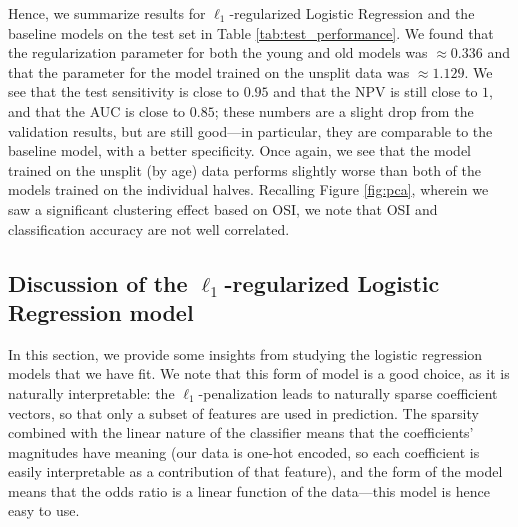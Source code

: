 \documentclass[11pt, letterpaper]{amsart}
\let\Oldsubsection\subsection
\renewcommand{\subsection}{\FloatBarrier\Oldsubsection}
\begin{document}
Hence, we summarize results for $\ell_1$-regularized Logistic Regression and the baseline models on the test set in Table \ref{tab:test_performance}. We found that the regularization parameter for both the young and old models was $\approx 0.336$ and that the parameter for the model trained on the unsplit data was $\approx 1.129$. We see that the test sensitivity is close to $0.95$ and that the NPV is still close to $1$, and that the AUC is close to $0.85$; these numbers are a slight drop from the validation results, but are still good---in particular, they are comparable to the baseline model, with a better specificity. Once again, we see that the model trained on the unsplit (by age) data performs slightly worse than both of the models trained on the individual halves. Recalling Figure \ref{fig:pca}, wherein we saw a significant clustering effect based on OSI, we note that OSI and classification accuracy are not well correlated. 
\begin{table}[h]
\caption{Algorithm performance on test data for each data split}\label{tab:test_performance}
\end{table}

\subsection{Discussion of the $\ell_1$-regularized Logistic Regression model} \label{ssec:discuss}

In this section, we provide some insights from studying the logistic regression models that we have fit. We note that this form of model is a good choice, as it is naturally interpretable: the $\ell_1$-penalization leads to naturally sparse coefficient vectors, so that only a subset of features are used in prediction. The sparsity combined with the linear nature of the classifier means that the coefficients' magnitudes have meaning (our data is one-hot encoded, so each coefficient is easily interpretable as a contribution of that feature), and the form of the model means that the odds ratio is a linear function of the data---this model is hence easy to use. 
\end{document}
